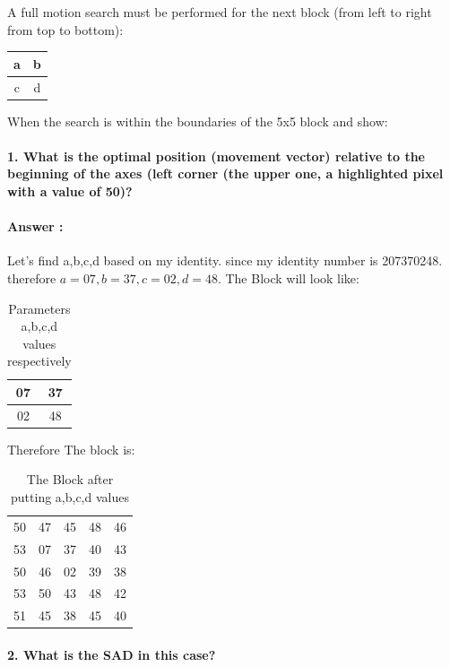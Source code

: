 \documentclass[letterpaper, 12pt]{article}
\begin{document}
A full motion search must be performed for the next block (from left to right from top to bottom):


\begin{table}[htbp]
    \centering
    \begin{tabular}{|c|c|} \hline 
         a& b\\ \hline 
         c& d\\ \hline
    \end{tabular}
\end{table}
When the search is within the boundaries of the 5x5 block and show:
\paragraph{1. What is the optimal position (movement vector) relative to the beginning of the axes (left corner (the upper one, a highlighted pixel with a value of 50)?}

\paragraph{Answer :} Let's find a,b,c,d based on my identity. since my identity number is 207370248. therefore $a = 07, b=37, c = 02 , d = 48$. The Block will look like: 
\begin{table}[htbp]
    \centering
    \begin{tabular}{|c|c|} \hline 
         07& 37\\ \hline 
         02& 48\\ \hline
    \end{tabular}
    \caption{Parameters a,b,c,d values respectively}
\end{table}
Therefore The block is:
\begin{table}[htbp]
    \centering
    \begin{tabular}{ccccc}
        50&  47&  45&  48& 46\\ 
         53&  07&  37&  40& 43\\
         50&  46&  02&  39& 38\\ 
         53&  50&  43&  48& 42\\ 
         51&  45&  38&  45& 40\\
    \end{tabular}
    \caption{The Block after putting a,b,c,d values}
\end{table}

\newpage

\paragraph{2. What is the SAD in this case?}
\end{document}
